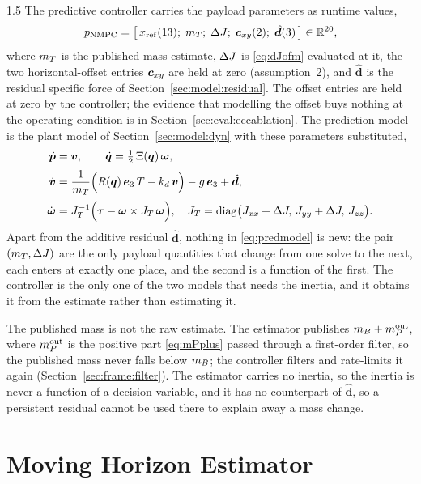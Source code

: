 \begin{spacing}{1.5}
The predictive controller carries the payload parameters as runtime values,
\begin{equation}
p_{\mathrm{NMPC}} = \bigl[\, x_{\mathrm{ref}}(13);\; m_T;\; \Delta J;\; \bm{c}_{xy}(2);\;
\hat{\bm d}(3) \,\bigr] \in \mathbb{R}^{20},
\label{eq:pnmpc}
\end{equation}
where $m_T$ is the published mass estimate, $\Delta J$ is \eqref{eq:dJofm} evaluated
at it, the two horizontal-offset entries $\bm{c}_{xy}$ are held at zero (assumption~2),
and $\hat{\bm d}$ is the residual specific force of
Section~\ref{sec:model:residual}. The offset entries are held at zero by the
controller; the evidence that modelling the offset buys nothing at the operating
condition is in Section~\ref{sec:eval:eccablation}. The prediction model is the plant model of
Section~\ref{sec:model:dyn} with these parameters substituted,
\begin{align}
\dot{\bm p} &= \bm v, \qquad
\dot{\bm q} = \tfrac{1}{2}\,\Xi(\bm q)\,\bm\omega, \nonumber\\[2pt]
\dot{\bm v} &= \frac{1}{m_T}\Bigl(R(\bm q)\,\bm{e}_3\,T - k_d\,\bm v\Bigr) - g\,\bm{e}_3
+ \hat{\bm d},
\nonumber\\[2pt]
\dot{\bm\omega} &= J_T^{-1}\Bigl(\bm\tau - \bm\omega \times J_T\,\bm\omega \Bigr),
\quad
J_T = \mathrm{diag}\bigl(J_{xx}+\Delta J,\, J_{yy}+\Delta J,\, J_{zz}\bigr).
\label{eq:predmodel}
\end{align}
Apart from the additive residual $\hat{\bm d}$, nothing in
\eqref{eq:predmodel} is new: the pair $(m_T,\Delta J)$ are the only payload quantities
that change from one solve to the next, each enters at exactly one place, and
the second is a function of the first. The controller is the only one of the
two models that needs the inertia, and it obtains it from the estimate rather
than estimating it.

The published mass is not the raw estimate. The estimator publishes
$m_B+m_P^{\mathrm{out}}$, where $m_P^{\mathrm{out}}$ is the positive part
\eqref{eq:mPplus} passed through a first-order filter, so the published mass
never falls below $m_B$; the controller filters and rate-limits it again
(Section~\ref{sec:frame:filter}). The estimator carries no inertia, so the
inertia is never a function of a decision variable, and it has no counterpart of
$\hat{\bm d}$, so a persistent residual cannot be used there to explain away a
mass change.

\section{Moving Horizon Estimator}\label{sec:frame:mhe}


\end{spacing}
